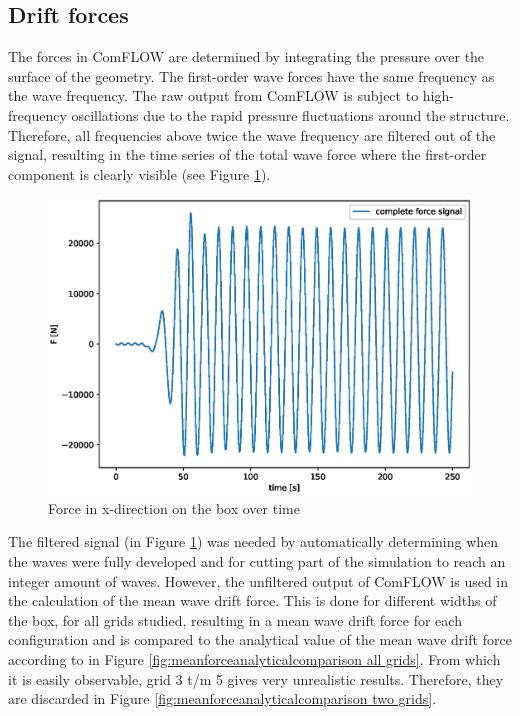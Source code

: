 \subsection{Drift forces}
\label{subsec: driftforces}
The forces in ComFLOW are determined by integrating the pressure over the surface of the geometry. The first-order wave forces have the same frequency as the wave frequency. The raw output from ComFLOW is subject to high-frequency oscillations due to the rapid pressure fluctuations around the structure. Therefore, all frequencies above twice the wave frequency are filtered out of the signal, resulting in the time series of the total wave force where the first-order component is clearly visible (see Figure \ref{fig:forceovertime}).\\
\begin{figure}[H]
    \centering
    \includegraphics[width=0.6\linewidth]{figures/Validation/forcesignal_on_single_box_eps.eps}
    \caption{Force in x-direction on the box over time}
    \label{fig:forceovertime}
\end{figure}
The filtered signal (in Figure \ref{fig:forceovertime}) was needed by automatically determining when the waves were fully developed and for cutting part of the simulation to reach an integer amount of waves. However, the unfiltered output of ComFLOW is used in the calculation of the mean wave drift force. This is done for different widths of the box, for all grids studied, resulting in a mean wave drift force for each configuration and is compared to the analytical value of the mean wave drift force according to \citet{longuethiggins1977} in Figure \ref{fig:meanforceanalyticalcomparison all grids}. From which it is easily observable, grid 3 t/m 5 gives very unrealistic results. Therefore, they are discarded in Figure \ref{fig:meanforceanalyticalcomparison two grids}.


